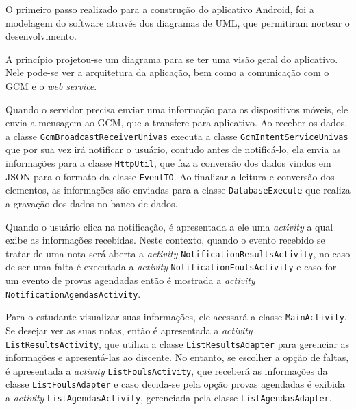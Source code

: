 
	\par O primeiro passo realizado para a construção do aplicativo Android, foi a
modelagem do software através dos diagramas de UML, que permitiram nortear o
desenvolvimento.

	\par A princípio projetou-se um diagrama para se ter uma visão geral do
aplicativo. Nele pode-se ver a arquitetura da aplicação, bem como a comunicação
com o GCM e o \textit{web service}.

	\par Quando o servidor precisa enviar uma informação para os dispositivos
móveis, ele envia a mensagem ao GCM, que a transfere para aplicativo. Ao
receber os dados, a classe \texttt{GcmBroadcastReceiverUnivas} executa a classe
\texttt{GcmIntentServiceUnivas} que por sua vez irá notificar o usuário,
contudo antes de notificá-lo, ela envia as informações para a classe
\texttt{HttpUtil}, que faz a conversão dos dados vindos em JSON para o formato
da classe \texttt{EventTO}. Ao finalizar a leitura e conversão dos elementos,
as informações são enviadas para a classe \texttt{DatabaseExecute} que realiza
a gravação dos dados no banco de dados.

	\par Quando o usuário clica na notificação, é apresentada a ele uma
\textit{activity} a qual exibe as informações recebidas. Neste contexto, quando
o evento recebido se tratar de uma nota será aberta a \textit{activity}
\texttt{NotificationResultsActivity}, no caso de ser uma falta é executada a
\textit{activity} \texttt{NotificationFoulsActivity} e caso for um evento de
provas agendadas então é mostrada a \textit{activity}
\texttt{NotificationAgendasActivity}.

	\par Para o estudante visualizar suas informações, ele acessará a classe
\texttt{MainActivity}. Se desejar ver as suas notas, então é apresentada a
\textit{activity} \texttt{ListResultsActivity}, que utiliza a classe
\texttt{ListResultsAdapter} para gerenciar as informações e apresentá-las ao
discente. No entanto, se escolher a opção de faltas, é apresentada a
\textit{activity} \texttt{ListFoulsActivity}, que receberá as informações da
classe \texttt{ListFoulsAdapter} e caso decida-se pela opção provas agendadas é
exibida a \textit{activity} \texttt{ListAgendasActivity}, gerenciada pela
classe \texttt{ListAgendasAdapter}.

